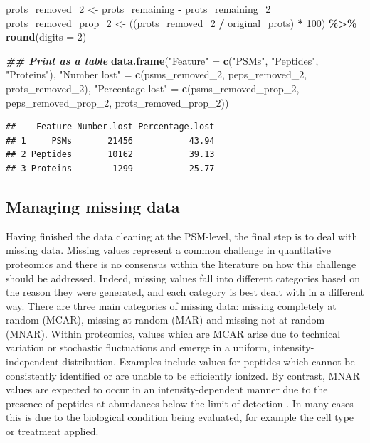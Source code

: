 \documentclass[9pt,a4paper,]{extarticle}
\newenvironment{Shaded}{\begin{snugshade}}{\end{snugshade}}
\newcommand{\AttributeTok}[1]{\textcolor[rgb]{0.13,0.29,0.53}{#1}}
\newcommand{\DecValTok}[1]{\textcolor[rgb]{0.00,0.00,0.81}{#1}}
\newcommand{\DocumentationTok}[1]{\textcolor[rgb]{0.56,0.35,0.01}{\textbf{\textit{#1}}}}
\newcommand{\FunctionTok}[1]{\textcolor[rgb]{0.13,0.29,0.53}{\textbf{#1}}}
\newcommand{\NormalTok}[1]{#1}
\newcommand{\OtherTok}[1]{\textcolor[rgb]{0.56,0.35,0.01}{#1}}
\newcommand{\SpecialCharTok}[1]{\textcolor[rgb]{0.81,0.36,0.00}{\textbf{#1}}}
\newcommand{\StringTok}[1]{\textcolor[rgb]{0.31,0.60,0.02}{#1}}
\begin{document}
\begin{Shaded}
\begin{Highlighting}[]
\NormalTok{prots\_removed\_2 }\OtherTok{\textless{}{-}}\NormalTok{ prots\_remaining }\SpecialCharTok{{-}}\NormalTok{ prots\_remaining\_2}
\NormalTok{prots\_removed\_prop\_2 }\OtherTok{\textless{}{-}}\NormalTok{ ((prots\_removed\_2 }\SpecialCharTok{/}\NormalTok{ original\_prots) }\SpecialCharTok{*} \DecValTok{100}\NormalTok{) }\SpecialCharTok{\%\textgreater{}\%}
  \FunctionTok{round}\NormalTok{(}\AttributeTok{digits =} \DecValTok{2}\NormalTok{)}


\DocumentationTok{\#\# Print as a table}
\FunctionTok{data.frame}\NormalTok{(}\StringTok{"Feature"} \OtherTok{=} \FunctionTok{c}\NormalTok{(}\StringTok{"PSMs"}\NormalTok{,}
                         \StringTok{"Peptides"}\NormalTok{,}
                         \StringTok{"Proteins"}\NormalTok{),}
           \StringTok{"Number lost"} \OtherTok{=} \FunctionTok{c}\NormalTok{(psms\_removed\_2,}
\NormalTok{                             peps\_removed\_2,}
\NormalTok{                             prots\_removed\_2),}
           \StringTok{"Percentage lost"} \OtherTok{=} \FunctionTok{c}\NormalTok{(psms\_removed\_prop\_2,}
\NormalTok{                                 peps\_removed\_prop\_2,}
\NormalTok{                                 prots\_removed\_prop\_2))}
\end{Highlighting}
\end{Shaded}

\begin{verbatim}
##    Feature Number.lost Percentage.lost
## 1     PSMs       21456           43.94
## 2 Peptides       10162           39.13
## 3 Proteins        1299           25.77
\end{verbatim}

\hypertarget{managing-missing-data}{%
\subsection{Managing missing data}\label{managing-missing-data}}

Having finished the data cleaning at the PSM-level, the final step is to deal
with missing data. Missing values represent a common challenge in quantitative
proteomics and there is no consensus within the literature on how this challenge
should be addressed. Indeed, missing values fall into different categories based
on the reason they were generated, and each category is best dealt with in a
different way. There are three main categories of missing data: missing
completely at random (MCAR), missing at random (MAR) and missing not at random
(MNAR). Within proteomics, values which are MCAR arise due to technical
variation or stochastic fluctuations and emerge in a uniform,
intensity-independent distribution. Examples include values for peptides which
cannot be consistently identified or are unable to be efficiently ionized. By
contrast, MNAR values are expected to occur in an intensity-dependent manner due
to the presence of peptides at abundances below the limit of detection
\citep{Karpievitch2009, Lazar2016, QFeat}. In many cases this is due to the biological
condition being evaluated, for example the cell type or treatment applied.
\end{document}
